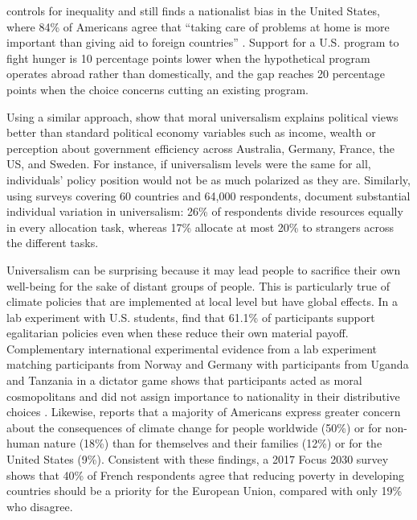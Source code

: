 \documentclass[11pt,a4paper]{article}
\begin{document}
\citet{prather_2013} controls for inequality and still finds a nationalist bias in the United States, where 84\% of Americans agree that ``taking care of problems at home is more important than giving aid to foreign countries'' \citep{PIPA2001}. Support for a U.S. program to fight hunger is 10 percentage points lower when the hypothetical program operates abroad rather than domestically, and the gap reaches 20 percentage points when the choice concerns cutting an existing program.

Using a similar approach, \citet{enke_moral_2023} show that moral universalism %
explains political views better than standard political economy variables such as income, wealth or perception about government efficiency across Australia, Germany, France, the US, and Sweden. For instance, if universalism levels were the same for all, individuals' policy position would not be as much polarized as they are. Similarly, using surveys covering 60 countries and 64,000 respondents, \citet{cappelen_universalism_2025} document substantial individual variation in universalism: 26\% of respondents divide resources equally in every allocation task, whereas 17\% allocate at most 20\% to strangers across the different tasks. %

Universalism can be surprising because it may lead people to sacrifice their own well-being for the sake of distant groups of people. This is particularly true of climate policies %
that are implemented at local level but have global effects. In a lab experiment with U.S. students, \citet{cherry_2017} find that 61.1\% of participants support egalitarian policies even when these reduce their own material payoff. Complementary international experimental evidence from a lab experiment matching participants from Norway and Germany with participants from Uganda and Tanzania in a dictator game shows that participants acted as moral cosmopolitans and did not assign importance to nationality in their distributive choices \citep{cappelen_needs_2013}. Likewise, \citet{leiserowitz_2006} reports that a majority of Americans express greater concern about the consequences of climate change for people worldwide (50\%) or for non-human nature (18\%) than for themselves and their families (12\%) or for the United States (9\%). Consistent with these findings, a 2017 Focus 2030 survey shows that 40\% of French respondents agree that reducing poverty in developing countries should be a priority for the European Union, compared with only 19\% who disagree.
\end{document}

